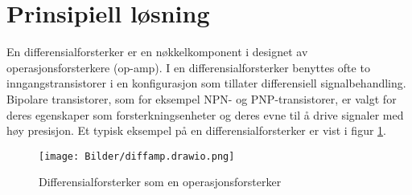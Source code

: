 \newpage
\section{Prinsipiell løsning}
\label{prinsipiellLoesning}

En differensialforsterker er en nøkkelkomponent i designet av operasjonsforsterkere (op-amp)\cite[s. 105]{Art of Eletronics}. I en differensialforsterker benyttes ofte to inngangstransistorer i en konfigurasjon som tillater differensiell signalbehandling. Bipolare transistorer, som for eksempel NPN- og PNP-transistorer, er valgt for deres egenskaper som forsterkningsenheter og deres evne til å drive signaler med høy presisjon. Et typisk eksempel på en differensialforsterker er vist i figur \ref{fig:diffamp}.

\begin{figure}[h]
    \centering
    \texttt{[image: Bilder/diffamp.drawio.png]}
    \caption{Differensialforsterker som en operasjonsforsterker}
    \label{fig:diffamp}
\end{figure}

